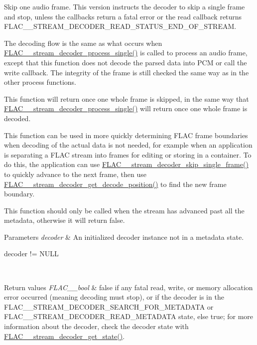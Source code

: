 Skip one audio frame. This version instructs the decoder to \textquotesingle{}skip\textquotesingle{} a single frame and stop, unless the callbacks return a fatal error or the read callback returns {\ttfamily F\+L\+A\+C\+\_\+\+\_\+\+S\+T\+R\+E\+A\+M\+\_\+\+D\+E\+C\+O\+D\+E\+R\+\_\+\+R\+E\+A\+D\+\_\+\+S\+T\+A\+T\+U\+S\+\_\+\+E\+N\+D\+\_\+\+O\+F\+\_\+\+S\+T\+R\+E\+AM}.

The decoding flow is the same as what occurs when \hyperlink{group__flac__stream__decoder_ga8c4708eb2c5d99595f64dc2473aa2f42}{F\+L\+A\+C\+\_\+\+\_\+stream\+\_\+decoder\+\_\+process\+\_\+single()} is called to process an audio frame, except that this function does not decode the parsed data into P\+CM or call the write callback. The integrity of the frame is still checked the same way as in the other process functions.

This function will return once one whole frame is skipped, in the same way that \hyperlink{group__flac__stream__decoder_ga8c4708eb2c5d99595f64dc2473aa2f42}{F\+L\+A\+C\+\_\+\+\_\+stream\+\_\+decoder\+\_\+process\+\_\+single()} will return once one whole frame is decoded.

This function can be used in more quickly determining F\+L\+AC frame boundaries when decoding of the actual data is not needed, for example when an application is separating a F\+L\+AC stream into frames for editing or storing in a container. To do this, the application can use \hyperlink{group__flac__stream__decoder_ga371bc2b4f5571e40c47f4db5a8a745f8}{F\+L\+A\+C\+\_\+\+\_\+stream\+\_\+decoder\+\_\+skip\+\_\+single\+\_\+frame()} to quickly advance to the next frame, then use \hyperlink{group__flac__stream__decoder_ga11507d25b6fdbd1efd5ee642923730fa}{F\+L\+A\+C\+\_\+\+\_\+stream\+\_\+decoder\+\_\+get\+\_\+decode\+\_\+position()} to find the new frame boundary.

This function should only be called when the stream has advanced past all the metadata, otherwise it will return {\ttfamily false}.


\begin{DoxyParams}{Parameters}
{\em decoder} & An initialized decoder instance not in a metadata state.  
\begin{DoxyCode}
decoder != NULL 
\end{DoxyCode}
 \\
\hline
\end{DoxyParams}

\begin{DoxyRetVals}{Return values}
{\em F\+L\+A\+C\+\_\+\+\_\+bool} & {\ttfamily false} if any fatal read, write, or memory allocation error occurred (meaning decoding must stop), or if the decoder is in the F\+L\+A\+C\+\_\+\+\_\+\+S\+T\+R\+E\+A\+M\+\_\+\+D\+E\+C\+O\+D\+E\+R\+\_\+\+S\+E\+A\+R\+C\+H\+\_\+\+F\+O\+R\+\_\+\+M\+E\+T\+A\+D\+A\+TA or F\+L\+A\+C\+\_\+\+\_\+\+S\+T\+R\+E\+A\+M\+\_\+\+D\+E\+C\+O\+D\+E\+R\+\_\+\+R\+E\+A\+D\+\_\+\+M\+E\+T\+A\+D\+A\+TA state, else {\ttfamily true}; for more information about the decoder, check the decoder state with \hyperlink{group__flac__stream__decoder_ga5899c204ad7183ec04e41855090c0635}{F\+L\+A\+C\+\_\+\+\_\+stream\+\_\+decoder\+\_\+get\+\_\+state()}. \\
\hline
\end{DoxyRetVals}


